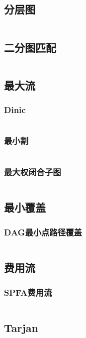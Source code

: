 \documentclass[a4paper,11pt]{article}
\begin{document}
\subsection{分层图} %
\inputminted[breaklines]{c++}{图论/分层图.cpp} %

\subsection{二分图匹配} %
\inputminted[breaklines]{c++}{图论/二分图匹配.cpp} %

\subsection{最大流} %
\subsubsection{Dinic} %
\inputminted[breaklines]{c++}{图论/Dinic.cpp} %
\subsubsection{最小割} %
\inputminted[breaklines]{c++}{图论/最小割.cpp} %
\subsubsection{最大权闭合子图} %
\inputminted[breaklines]{c++}{图论/最大权闭合子图.cpp} %
\subsection{最小覆盖} %
\subsubsection{DAG最小点路径覆盖} %
\inputminted[breaklines]{c++}{图论/最小点路径覆盖.cpp} %
\subsection{费用流} %
\subsubsection{SPFA费用流} %
\inputminted[breaklines]{c++}{图论/SPFA费用流.cpp} %

\subsection{Tarjan} %
\end{document}
